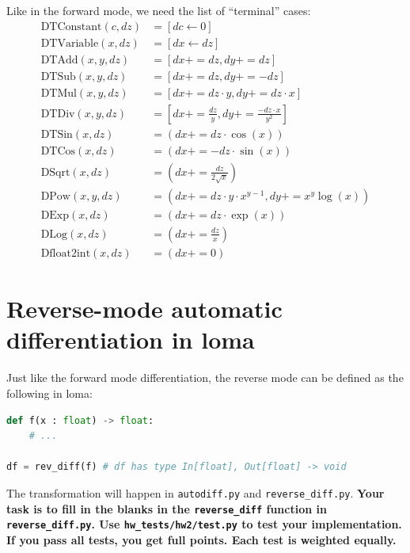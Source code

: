 Like in the forward mode, we need the list of ``terminal'' cases:
\begin{equation}
\begin{aligned}
\text{DTConstant}(c, dz) &= \left[dc \leftarrow 0\right] \\
\text{DTVariable}(x, dz) &= \left[dx \leftarrow dz\right] \\
\text{DTAdd}(x, y, dz) &= \left[dx += dz, dy += dz\right] \\
\text{DTSub}(x, y, dz) &= \left[dx += dz, dy += -dz\right] \\
\text{DTMul}(x, y, dz) &= \left[dx += dz \cdot y, dy += dz \cdot x\right] \\
\text{DTDiv}(x, y, dz) &= \left[dx += \frac{dz}{y}, dy += \frac{-dz \cdot x}{y^2}\right] \\
\text{DTSin}(x, dz) &= \left(dx += dz \cdot \cos(x)\right) \\
\text{DTCos}(x, dz) &= \left(dx += -dz \cdot \sin(x)\right) \\
\text{DSqrt}(x, dz) &= \left(dx += \frac{dz}{2\sqrt{x}} \right) \\
\text{DPow}(x, y, dz) &= \left(dx += dz \cdot y \cdot x^{y-1}, dy += x^y \log(x) \right) \\
\text{DExp}(x, dz) &= \left(dx += dz \cdot \exp(x) \right) \\
\text{DLog}(x, dz) &= \left(dx += \frac{dz}{x} \right) \\
\text{Dfloat2int}(x, dz) &= \left(dx += 0\right)
\end{aligned}
\end{equation}

\section{Reverse-mode automatic differentiation in loma}

Just like the forward mode differentiation, the reverse mode can be defined as the following in loma:
\begin{lstlisting}[language=Python]
def f(x : float) -> float:
	# ...

df = rev_diff(f) # df has type In[float], Out[float] -> void
\end{lstlisting}

The transformation will happen in \lstinline{autodiff.py} and \lstinline{reverse_diff.py}. \textbf{Your task is to fill in the blanks in the \lstinline{reverse_diff} function in \lstinline{reverse_diff.py}. Use \lstinline{hw_tests/hw2/test.py} to test your implementation. If you pass all tests, you get full points. Each test is weighted equally.}

